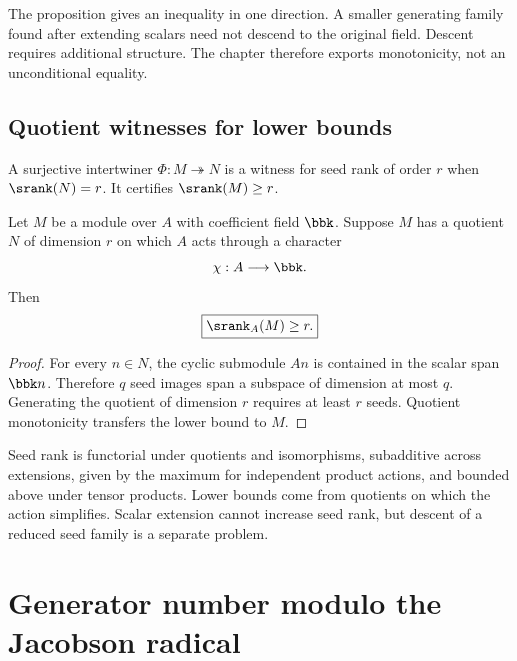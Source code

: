 \begin{hypothesisguide}
The proposition gives an inequality in one direction.  A smaller generating family found after extending scalars need not descend to the original field.  Descent requires additional structure.  The chapter therefore exports monotonicity, not an unconditional equality.
\end{hypothesisguide}


\subsection{Quotient witnesses for lower bounds}
\begin{definition}
\label{def:seed-rank-witness}
A surjective intertwiner $\Phi:M\twoheadrightarrow N$ is a witness for seed rank of order $r$ when $\srank(N)=r$.  It certifies $\srank(M)\geq r$.
\end{definition}

\begin{proposition}
\label{prop:scalar-quotient}
Let $M$ be a module over $A$ with coefficient field $\bbk$.  Suppose $M$ has a quotient $N$ of dimension $r$ on which $A$ acts through a character
\[
\chi:A\longrightarrow\bbk.
\]
Then
\[
\boxed{\srank_A(M)\geq r.}
\]
\end{proposition}

\begin{proof}
For every $n\in N$, the cyclic submodule $An$ is contained in the scalar span $\bbk n$.  Therefore $q$ seed images span a subspace of dimension at most $q$.  Generating the quotient of dimension $r$ requires at least $r$ seeds.  Quotient monotonicity transfers the lower bound to $M$.
\end{proof}

\begin{sectionrecap}
Seed rank is functorial under quotients and isomorphisms, subadditive across extensions, given by the maximum for independent product actions, and bounded above under tensor products.  Lower bounds come from quotients on which the action simplifies.  Scalar extension cannot increase seed rank, but descent of a reduced seed family is a separate problem.
\end{sectionrecap}

\section{Generator number modulo the Jacobson radical}



